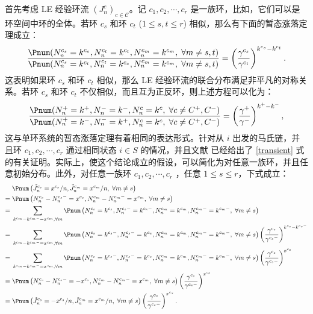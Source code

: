 首先考虑 LE 经验环流 $(J^c_n)_{c\in\mathcal{C}}$。记 $c_1,c_2,\cdots,c_r$ 是一族环，比如，它们可以是环空间中环的全体。若环 $c_s$ 和环 $c_t$ ($1\le s,t\le r$) 相似，那么有下面的暂态涨落定理成立：
\begin{equation}\label{transient}
    \frac{\Pnum(N^{c_s}_n=k^{c_s},N^{c_t}_n=k^{c_t},N^{c_m}_n=k^{c_m},\;\forall m\neq s,t)}
    {\Pnum(N^{c_s}_n=k^{c_t},N^{c_t}_n=k^{c_s},N^{c_m}_n=k^{c_m},\;\forall m\neq s,t)}
    = \left(\frac{\gamma^{c_s}}{\gamma^{c_t}}\right)^{k^{c_s}-k^{c_t}}.
\end{equation}
这表明如果环 $c_s$ 和环 $c_t$ 相似，那么 LE 经验环流的联合分布满足非平凡的对称关系。若环 $c_s$ 和环 $c_t$ 不仅相似，而且互为正反环，则上述方程可以化为：
\begin{equation*}
    \frac{\Pnum(N^+_n=k^+,N^-_n=k^-,N^c_n=k^c,\;\forall c\neq C^+,C^-)}
    {\Pnum(N^+_n=k^-,N^-_n=k^+,N^c_n=k^c,\;\forall c\neq C^+,C^-)}
    = \left(\frac{\gamma^+}{\gamma^-}\right)^{k^+-k^-},
\end{equation*}
这与单环系统的暂态涨落定理有着相同的表达形式。针对从 $i$ 出发的马氏链，并且环 $c_1,c_2,\cdots,c_r$ 通过相同状态 $i\in S$ 的情况，并且文献 \cite{jia2016cycle} 已经给出了 \eqref{transient} 式的有关证明。实际上，使这个结论成立的假设，可以简化为对任意一族环，并且任意初始分布。此外，对任意一族环  $c_1,c_2,\cdots,c_r$ ，任意 $1\le s\le r$，下式成立：
\begin{align*}
&\; \Pnum\left(\tilde{J}^{c_s}_n=x^{c_s}/n,\tilde{J}^{c_m}_n=x^{c_m}/n,\;\forall m\neq s\right) \\
=&\; \Pnum\left(N^{c_s}_n-N^{c_s-}_n=x^{c_s},N^{c_m}_n-N^{c_m-}_n=x^{c_m},\;\forall m\neq s\right) \\
=&\; \sum_{k^{c_m}-k^{c_m-}=x^{c_m},\forall  m }\Pnum\left(N^{c_s}_n=k^{c_s},N^{c_s-}_n=k^{c_s-},  N^{c_m}_n=k^{c_m},N^{c_m-}_n=k^{c_m-},\;\forall m\neq s\right) \\
=&\; \sum_{k^{c_m}-k^{c_m-}=x^{c_m},\forall  m }\Pnum\left(N^{c_s}_n=k^{c_s-},N^{c_s-}_n=k^{c_s}, N^{c_m}_n=k^{c_m},N^{c_m-}_n=k^{c_m-},\;\forall m\neq s\right)\left(\frac{\gamma^{c_s}}{\gamma^{c_s-}}\right)^{k^{c_s}-k^{c_s-}}  \\
=&\; \sum_{k^{c_m}-k^{c_m-}=x^{c_m},\forall  m }\Pnum\left(N^{c_s}_n=k^{c_s-},N^{c_s-}_n=k^{c_s}, N^{c_m}_n=k^{c_m},N^{c_m-}_n=k^{c_m-},\;\forall m\neq s\right)\left(\frac{\gamma^{c_s}}{\gamma^{c_s-}}\right)^{x^{c_s}} \\
=&\; \Pnum\left(N^{c_s}_n-N^{c_s-}_n=-x^{c_s},N^{c_m}_n-N^{c_m-}_n=x^{c_m},\;\forall m\neq s\right)\left(\frac{\gamma^{c_s}}{\gamma^{c_s-}}\right)^{x^{c_s}} \\
=&\; \Pnum\left(\tilde{J}^{c_s}_n=-x^{c_s}/n,\tilde{J}^{c_m}_n=x^{c_m}/n,\;\forall m\neq s\right)\left(\frac{\gamma^{c_s}}{\gamma^{c_s-}}\right)^{x^{c_s}}.
\end{align*}

